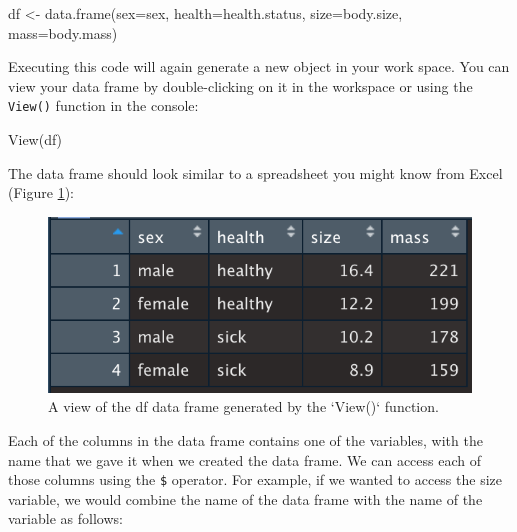 \documentclass[
]{book}
\newenvironment{Shaded}{\begin{snugshade}}{\end{snugshade}}
\newcommand{\AttributeTok}[1]{\textcolor[rgb]{0.77,0.63,0.00}{#1}}
\newcommand{\DataTypeTok}[1]{\textcolor[rgb]{0.13,0.29,0.53}{#1}}
\newcommand{\FunctionTok}[1]{\textcolor[rgb]{0.00,0.00,0.00}{#1}}
\newcommand{\NormalTok}[1]{#1}
\newcommand{\OtherTok}[1]{\textcolor[rgb]{0.56,0.35,0.01}{#1}}
\newcommand{\SpecialCharTok}[1]{\textcolor[rgb]{0.00,0.00,0.00}{#1}}
\begin{document}
\begin{Shaded}
\begin{Highlighting}[]
\NormalTok{df }\OtherTok{\textless{}{-}} \FunctionTok{data.frame}\NormalTok{(}\AttributeTok{sex=}\NormalTok{sex, }\AttributeTok{health=}\NormalTok{health.status, }\AttributeTok{size=}\NormalTok{body.size, }\AttributeTok{mass=}\NormalTok{body.mass)}
\end{Highlighting}
\end{Shaded}

Executing this code will again generate a new object in your work space. You can view your data frame by double-clicking on it in the workspace or using the \texttt{View()} function in the console:

\begin{Shaded}
\begin{Highlighting}[]
\DataTypeTok{View}\NormalTok{(df)}
\end{Highlighting}
\end{Shaded}

The data frame should look similar to a spreadsheet you might know from Excel (Figure \ref{fig:df1}):

\begin{figure}

{\centering \includegraphics[width=0.5\linewidth]{images/dataframe} 

}

\caption{A view of the df data frame generated by the `View()` function.}\label{fig:df1}
\end{figure}

Each of the columns in the data frame contains one of the variables, with the name that we gave it when we created the data frame. We can access each of those columns using the \texttt{\$} operator. For example, if we wanted to access the size variable, we would combine the name of the data frame with the name of the variable as follows:

\begin{Shaded}
\end{Shaded}
\end{document}
